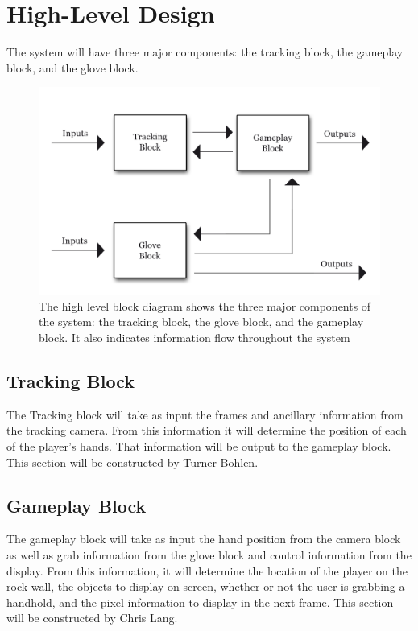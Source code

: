 \section{High-Level Design}
\label{sec:highlevel}

The system will have three major components: the tracking block, the gameplay
block, and the glove block.

\begin{figure}
\centering
\includegraphics[scale=1]{img/high-level.png}
\caption{The high level block diagram shows the three major components of the
system: the tracking block, the glove block, and the gameplay block. It also
indicates information flow throughout the system}
\label{fig:high}
\end{figure}

\subsection{Tracking Block}

The Tracking block will take as input the frames and ancillary information from
the tracking camera. From this information it will determine the position of
each of the player's hands. That information will be output to the gameplay
block. This section will be constructed by Turner Bohlen.

\subsection{Gameplay Block}

The gameplay block will take as input the hand position from the camera block as
well as grab information from the glove block and control information from the
display. From this information, it will determine the location of the player on
the rock wall, the objects to display on screen, whether or not the user is
grabbing a handhold, and the pixel information to display in the next frame.
This section will be constructed by Chris Lang.

